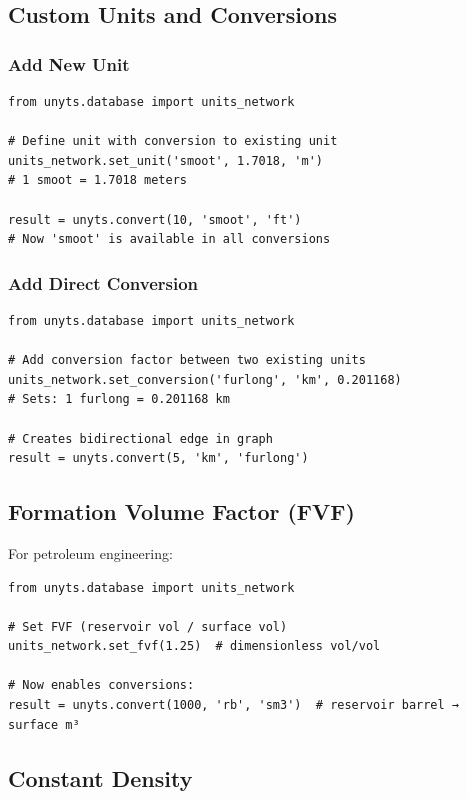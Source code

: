 \documentclass[11pt,a4paper]{report}
\begin{document}
\subsection{Custom Units and Conversions}

\subsubsection{Add New Unit}

\begin{lstlisting}[style=pythonstyle]
from unyts.database import units_network

# Define unit with conversion to existing unit
units_network.set_unit('smoot', 1.7018, 'm')  
# 1 smoot = 1.7018 meters

result = unyts.convert(10, 'smoot', 'ft')
# Now 'smoot' is available in all conversions
\end{lstlisting}

\subsubsection{Add Direct Conversion}

\begin{lstlisting}[style=pythonstyle]
from unyts.database import units_network

# Add conversion factor between two existing units
units_network.set_conversion('furlong', 'km', 0.201168)
# Sets: 1 furlong = 0.201168 km

# Creates bidirectional edge in graph
result = unyts.convert(5, 'km', 'furlong')
\end{lstlisting}

\subsection{Formation Volume Factor (FVF)}

For petroleum engineering:

\begin{lstlisting}[style=pythonstyle]
from unyts.database import units_network

# Set FVF (reservoir vol / surface vol)
units_network.set_fvf(1.25)  # dimensionless vol/vol

# Now enables conversions:
result = unyts.convert(1000, 'rb', 'sm3')  # reservoir barrel → surface m³
\end{lstlisting}

\subsection{Constant Density}
\end{document}
